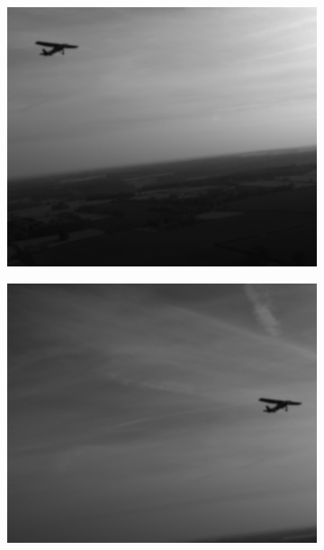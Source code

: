 {\begin{figure}[p]
  \centering
  \begin{subfigure}[][][t]{0.3\textwidth}
      \includegraphics[width=1\linewidth]{figures/crop_strat_legal1.png}
  \end{subfigure}
  \begin{subfigure}[][][t]{0.3\textwidth}
      \includegraphics[width=1\linewidth]{figures/crop_strat_legal2.png}
  \end{subfigure}
  \begin{subfigure}[][][t]{0.3\textwidth}

\end{subfigure}
\end{figure}}

